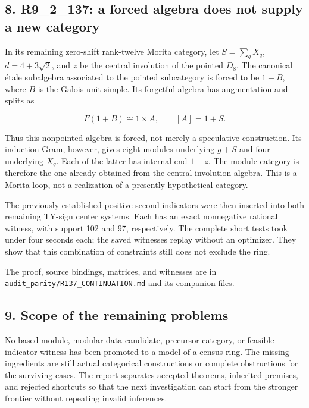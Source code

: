 \documentclass[
  11pt,
]{article}
\begin{document}
\hypertarget{r9_2_137-a-forced-algebra-does-not-supply-a-new-category}{%
\subsection{8. R9\_2\_137: a forced algebra does not supply a new
category}\label{r9_2_137-a-forced-algebra-does-not-supply-a-new-category}}

In its remaining zero-shift rank-twelve Morita category, let
\(S=\sum_qX_q\), \(d=4+3\sqrt2\), and \(z\) be the central involution of
the pointed \(D_8\). The canonical étale subalgebra associated to the
pointed subcategory is forced to be \(1+B\), where \(B\) is the
Galois-unit simple. Its forgetful algebra has augmentation and splits as

\[
F(1+B)\cong1\times A,\qquad [A]=1+S.
\]

Thus this nonpointed algebra is forced, not merely a speculative
construction. Its induction Gram, however, gives eight modules
underlying \(g+S\) and four underlying \(X_q\). Each of the latter has
internal end \(1+z\). The module category is therefore the one already
obtained from the central-involution algebra. This is a Morita loop, not
a realization of a presently hypothetical category.

The previously established positive second indicators were then inserted
into both remaining TY-sign center systems. Each has an exact
nonnegative rational witness, with support 102 and 97, respectively. The
complete short tests took under four seconds each; the saved witnesses
replay without an optimizer. They show that this combination of
constraints still does not exclude the ring.

The proof, source bindings, matrices, and witnesses are in
\texttt{audit\_parity/R137\_CONTINUATION.md} and its companion files.

\hypertarget{scope-of-the-remaining-problems}{%
\subsection{9. Scope of the remaining
problems}\label{scope-of-the-remaining-problems}}

No based module, modular-data candidate, precursor category, or feasible
indicator witness has been promoted to a model of a census ring. The
missing ingredients are still actual categorical constructions or
complete obstructions for the surviving cases. The report separates
accepted theorems, inherited premises, and rejected shortcuts so that
the next investigation can start from the stronger frontier without
repeating invalid inferences.
\end{document}
